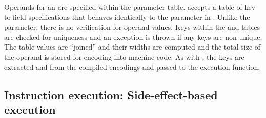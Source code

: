 
Operands for an  are specified within the  parameter table.  accepts a table of key to field specifications that behaves identically to the parameter in . Unlike the  parameter, there is no verification for operand values. Keys within the  and  tables are checked for uniqueness and an exception is thrown if any keys are non-unique. The table values are ``joined'' and their widths are computed and the total size of the operand is stored for encoding into machine code. As with , the keys are extracted and from the compiled encodings and passed to the execution function. 

\subsection{Instruction execution: Side-effect-based execution}
\label{sec:lua:sec:instructions:sec:exec}

